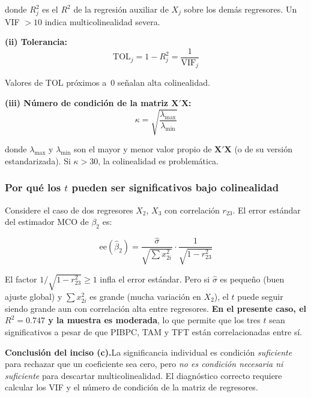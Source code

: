 \documentclass[12pt, letterpaper]{article}
\begin{document}
\noindent donde $R_j^2$ es el $R^2$ de la regresión auxiliar de $X_j$ sobre los
demás regresores. Un VIF $> 10$ indica multicolinealidad severa.

\medskip
\noindent\textbf{(ii) Tolerancia:}
\begin{equation}
  \text{TOL}_j = 1 - R_j^2 = \frac{1}{\text{VIF}_j}
  \label{eq:TOL}
\end{equation}

\noindent Valores de TOL próximos a~0 señalan alta colinealidad.

\medskip
\noindent\textbf{(iii) Número de condición de la matriz $\mathbf{X'X}$:}
\begin{equation}
  \kappa = \sqrt{\frac{\lambda_{\max}}{\lambda_{\min}}}
  \label{eq:condicion}
\end{equation}

\noindent donde $\lambda_{\max}$ y $\lambda_{\min}$ son el mayor y menor valor
propio de $\mathbf{X'X}$ (o de su versión estandarizada). Si $\kappa > 30$, la
colinealidad es problemática.

\subsubsection{Por qué los $t$ pueden ser significativos bajo colinealidad}

Considere el caso de dos regresores $X_2$, $X_3$ con correlación $r_{23}$.
El error estándar del estimador MCO de $\beta_2$ es:

\begin{equation}
  \text{ee}(\hat{\beta}_2)
    = \frac{\hat{\sigma}}{\sqrt{\sum x_{2i}^2}}
      \cdot \frac{1}{\sqrt{1 - r_{23}^2}}
  \label{eq:ee_multicol}
\end{equation}

\noindent El factor $1/\sqrt{1-r_{23}^2} \geq 1$ infla el error estándar. Pero si
$\hat{\sigma}$ es pequeño (buen ajuste global) y $\sum x_{2i}^2$ es grande
(mucha variación en $X_2$), el $t$ puede seguir siendo grande aun con
correlación alta entre regresores. \textbf{En el presente caso, el $R^2 = 0.747$
y la muestra es moderada}, lo que permite que los tres $t$ sean significativos
a pesar de que PIBPC, TAM y TFT están correlacionadas entre sí.

\medskip
\noindent\textbf{Conclusión del inciso (c).}\quad La significancia individual es
condición \emph{suficiente} para rechazar que un coeficiente sea cero, pero
\emph{no es condición necesaria ni suficiente} para descartar multicolinealidad.
El diagnóstico correcto requiere calcular los VIF y el número de condición de la
matriz de regresores.
\end{document}
